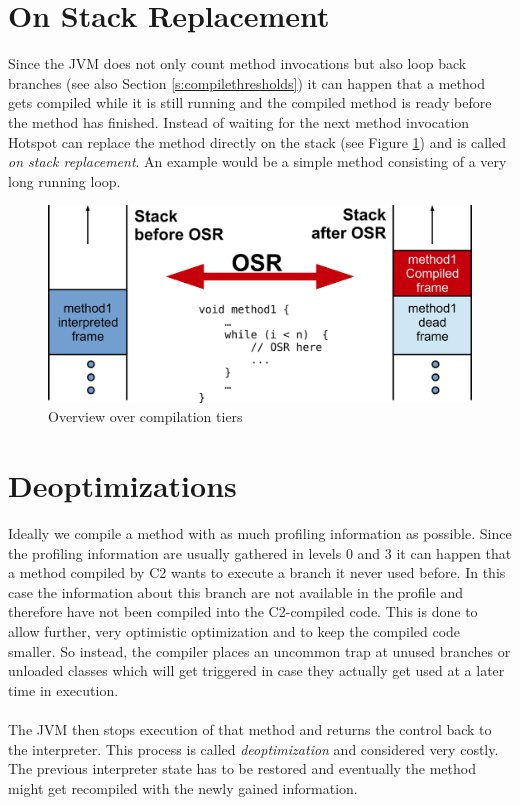 \section{On Stack Replacement}
\label{s:onstackreplacement}
Since the JVM does not only count method invocations but also loop back branches (see also Section \ref{s:compilethresholds}) it can happen that a method gets compiled while it is still running and the compiled method is ready before the method has finished.
Instead of waiting for the next method invocation Hotspot can replace the method directly on the stack (see Figure \ref{f:osr}) and is called \textit{on stack replacement}.
An example would be a simple method consisting of a very long running loop.
\begin{figure}[h]
  \begin{center}
    \centering
    \includegraphics{figures/osr.png}
    \caption{Overview over compilation tiers}
    \label{f:osr}
  \end{center}
\end{figure}

\section{Deoptimizations}
\label{s:deoptimizations}
Ideally we compile a method with as much profiling information as possible.
Since the profiling information are usually gathered in levels 0 and 3 it can happen that a method compiled by C2 wants to execute a branch it never used before.
In this case the information about this branch are not available in the profile and therefore have not been compiled into the C2-compiled code.
This is done to allow further, very optimistic optimization and to keep the compiled code smaller. So instead, the compiler places an uncommon trap at unused branches or unloaded classes which will get triggered in case they actually get used at a later time in execution.
\\\\
The JVM then stops execution of that method and returns the control back to the interpreter. This process is called \textit{deoptimization} and considered very costly. The previous interpreter state has to be restored and eventually the method might get recompiled with the newly gained information.

